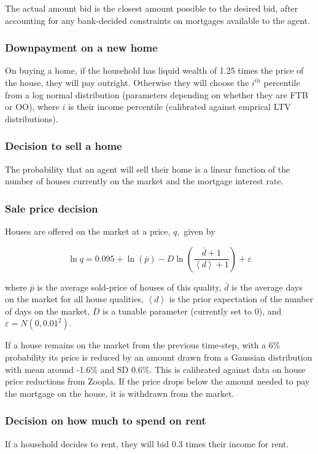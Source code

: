 \documentclass{article}
\begin{document}
The actual amount bid is the closest amount possible to the desired bid, after accounting for any bank-decided constraints on mortgages available to the agent.

\subsubsection{Downpayment on a new home}
On buying a home, if the household has liquid wealth of 1.25 times the price of the house, they will pay outright. Otherwise they will choose the $i^{th}$ percentile from a log normal distribution (parameters depending on whether they are FTB or OO), where $i$ is their income percentile (calibrated against emprical LTV distributions).

\subsubsection{Decision to sell a home}
The probability that an agent will sell their home is a linear function of the number of houses currently on the market and the mortgage interest rate.

\subsubsection{Sale price decision}
Houses are offered on the market at a price, $q,$ given by

\begin{equation}
\ln q=0.095+\ln (\bar{p})-D\ln \left( \frac{\bar{d}+1}{\left\langle
d\right\rangle +1}\right) +\varepsilon
\end{equation}

\bigskip

where $\bar{p}$ is the average sold-price of houses of this quality, $\bar{d}
$ is the average days on the market for all house qualities, $\left\langle
d\right\rangle $ is the prior expectation of the number of days on the
market, $D$ is a tunable parameter (currently set to 0), and $\varepsilon
=N(0,0.01^{2})$.

If a house remains on the market from the previous time-step, with a 6\%
probability its price is reduced by an amount drawn from a Gaussian
distribution with mean around -1.6\% and SD 0.6\%. This is calibrated
against data on house price reductions from Zoopla. If the price drops below the amount needed to pay the mortgage on the house, it is withdrawn from the
market.

\subsubsection{Decision on how much to spend on rent}
If a household decides to rent, they will bid 0.3 times their income for rent.
\end{document}
